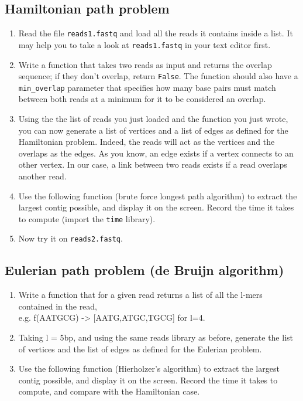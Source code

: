 \documentclass[a4paper,11pt]{article}
\begin{document}
\subsection{Hamiltonian path problem}
\begin{enumerate}
\item Read the file \texttt{reads1.fastq} and load all the reads it contains inside a list. It may help you to take a look at \texttt{reads1.fastq} in your text editor first.
\item Write a function that takes two reads as input and returns the overlap sequence; if they don't overlap, return \texttt{False}. The function should also have a \texttt{min\_overlap} parameter that specifies how many base pairs must match between both reads at a minimum for it to be considered an overlap.
\item Using the the list of reads you just loaded and the function you just wrote, you can now generate a list of vertices and a list of edges as defined for the Hamiltonian problem. Indeed, the reads will act as the vertices and the overlaps as the edges. As you know, an edge exists if a vertex connects to an other vertex. In our case, a link between two reads exists if a read overlaps another read.
\item Use the following function (brute force longest path algorithm) to extract the largest contig possible, and display it on the screen. Record the time it takes to compute (import the \texttt{time} library).
\item Now try it on \texttt{reads2.fastq}.

\end{enumerate}

\subsection{Eulerian path problem (de Bruijn algorithm)}
\begin{enumerate}
\item Write a function that for a given read returns a list of all the l-mers contained in the read, \\
e.g. f(AATGCG) ->  [AATG,ATGC,TGCG] for l=4.
\item Taking l = 5bp, and using the same reads library as before, generate the list of vertices and the list of edges as defined for the Eulerian problem.
\item Use the following function (Hierholzer's algorithm) to extract the largest contig possible, and display it on the screen. Record the time it takes to compute, and compare with the Hamiltonian case.
\end{enumerate}
\end{document}

